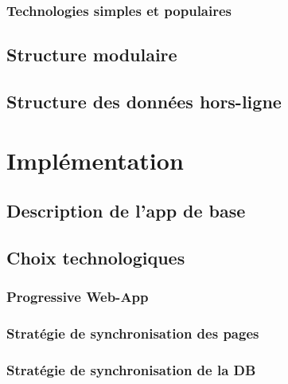 \documentclass{EPL-master-thesis-covers-FR}
\begin{document}
			\subsection*{Technologies simples et populaires}


		\section{Structure modulaire}
			\label{sec:modules}


			

		\section{Structure des données hors-ligne}
			\label{sec:data}


	\chapter{Implémentation}

		\section{Description de l'app de base}
		
		\section{Choix technologiques}
			\label{sec:choix_tech}
			
			\subsection*{Progressive Web-App}
				
			\subsection{Stratégie de synchronisation des pages}			
			
			\subsection{Stratégie de synchronisation de la DB}
			
\end{document}

